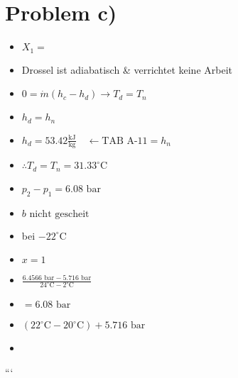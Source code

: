 \section*{Problem c)}

\begin{itemize}
    \item $X_1 =$
    \item Drossel ist adiabatisch \& verrichtet keine Arbeit
    \item $0 = \dot{m} (h_c - h_d) \rightarrow T_d = T_n$
    \item $h_d = h_n$
    \item $h_d = 53.42 \frac{\text{kJ}}{\text{kg}} \quad \leftarrow \text{TAB A-11} = h_n$
    \item $\therefore T_d = T_n = 31.33^\circ \text{C}$
    \item $p_2 - p_1 = 6.08 \text{ bar}$
    \item $b \text{ nicht gescheit}$
    \item bei $-22^\circ \text{C}$
    \item $x = 1$
    \item $\frac{6.4566 \text{ bar} - 5.716 \text{ bar}}{24^\circ \text{C} - 2^\circ \text{C}}$
    \item $= 6.08 \text{ bar}$
    \item $(22^\circ \text{C} - 20^\circ \text{C}) + 5.716 \text{ bar}$
    \item {}
\end{itemize}

```